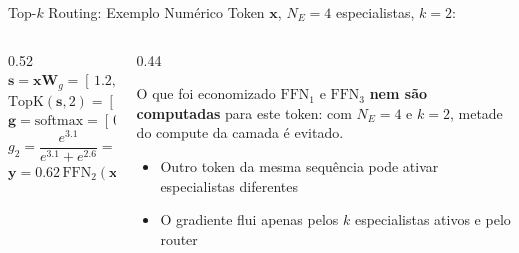 \documentclass[aspectratio=169, xcolor=dvipsnames]{beamer}
\begin{document}
  \begin{frame}{Top-$k$ Routing: Exemplo Numérico}
    Token $\mathbf{x}$, $N_E=4$ especialistas, $k=2$:
    \vspace{0.3em}
    \begin{columns}[T]
      \begin{column}{0.52\textwidth}
        {\setlength{\fboxsep}{3pt}%
        \colorbox{CellYellow}{$\mathbf{s} = \mathbf{x} \mathbf{W}_g = [\,1.2,\;\mathbf{3.1},\;0.4,\;\mathbf{2.6}\,]$}\\[0.45em]
        \colorbox{CellBlue}{$\text{TopK}(\mathbf{s}, 2) = [\,-\infty,\;3.1,\;-\infty,\;2.6\,]$}\\[0.45em]
        \colorbox{CellGreen}{$\mathbf{g} = \text{softmax} = [\,0,\;\mathbf{0.62},\;0,\;\mathbf{0.38}\,]$}\\[0.45em]
        }%
        {\footnotesize $g_2 = \dfrac{e^{3.1}}{e^{3.1}+e^{2.6}} = \dfrac{22.2}{35.7} = 0.62$}\\[0.5em]
        {\setlength{\fboxsep}{3pt}%
        \colorbox{PastelOrange}{$\mathbf{y} = 0.62\,\text{FFN}_2(\mathbf{x}) + 0.38\,\text{FFN}_4(\mathbf{x})$}
        }
      \end{column}
      \begin{column}{0.44\textwidth}
        \begin{exampleblock}{O que foi economizado}
          $\text{FFN}_1$ e $\text{FFN}_3$ \textbf{nem são computadas} para este token: com $N_E=4$ e $k=2$, metade do compute da camada é evitado.
        \end{exampleblock}
        \vspace{0.3em}
        \begin{itemize}
          \item Outro token da mesma sequência pode ativar especialistas diferentes
          \item O gradiente flui apenas pelos $k$ especialistas ativos e pelo router
        \end{itemize}
      \end{column}
    \end{columns}
  \end{frame}
\end{document}
